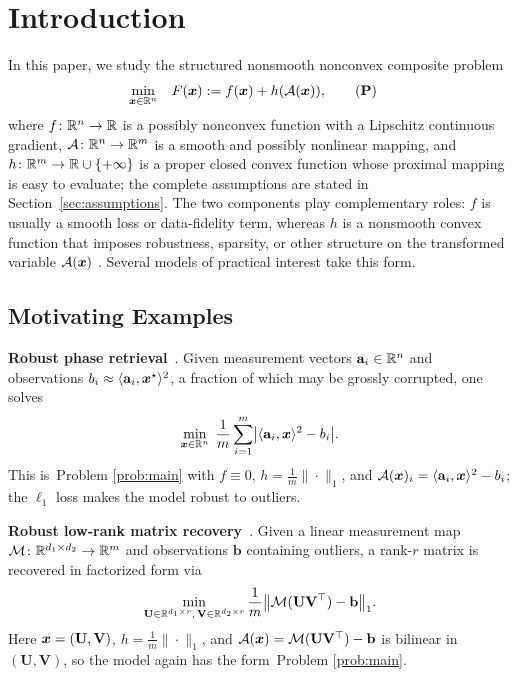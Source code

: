 \section{Introduction}
\label{sec:introduction}
In this paper, we study the structured nonsmooth nonconvex composite problem
\begin{align}
    \min_{\bx\in\RR^n}\quad & F(\bx) := f(\bx) + h(\calA(\bx)),
    \tag{\textbf{P}}
    \label{prob:main}
\end{align}
where $f\colon\mathbb{R}^n\to\mathbb{R}$ is a possibly nonconvex function with a Lipschitz
continuous gradient, $\mathcal{A}\colon\mathbb{R}^n\to\mathbb{R}^m$ is a smooth and possibly nonlinear
mapping, and $h\colon\mathbb{R}^m\to\mathbb{R}\cup\{+\infty\}$ is a proper closed convex function
whose proximal mapping is easy to evaluate; the complete assumptions are stated in
Section~\ref{sec:assumptions}. The two components play complementary roles: $f$ is
usually a smooth loss or data-fidelity term, whereas $h$ is a nonsmooth convex function
that imposes robustness, sparsity, or other structure on the transformed variable
$\mathcal{A}(\bm{x})$
\cite{charisopoulos2021low,markovsky2008structured,parekh2015convex}. Several models
of practical interest take this form. 

\subsection{Motivating Examples}

\textbf{Robust phase retrieval}~\cite{duchi2019solving}.
Given measurement vectors $\mathbf a_i\in\mathbb{R}^n$ and observations
$b_i\approx\langle\mathbf a_i,\bm{x}^\star\rangle^2$, a fraction of which may be grossly
corrupted, one solves
\begin{equation*}
  \min_{\bm{x}\in\mathbb{R}^n}\;\frac1m\sum_{i=1}^m
  \bigl|\langle\mathbf a_i,\bm{x}\rangle^2-b_i\bigr|.
\end{equation*}
This is~Problem \eqref{prob:main} with $f\equiv0$, $h=\frac1m\|\cdot\|_1$, and
$\mathcal{A}(\bm{x})_i=\langle\mathbf a_i,\bm{x}\rangle^2-b_i$; the $\ell_1$ loss makes the
model robust to outliers.

\textbf{Robust low-rank matrix recovery}~\cite{charisopoulos2021low}.
Given a linear measurement map $\mathcal M\colon\mathbb{R}^{d_1\times d_2}\to\mathbb{R}^m$ and
observations $\mathbf b$ containing outliers, a rank-$r$ matrix is recovered in
factorized form via
\begin{equation*}
  \min_{\mathbf U\in\mathbb{R}^{d_1\times r},\,\mathbf V\in\mathbb{R}^{d_2\times r}}
  \frac1m\bigl\|\mathcal M(\mathbf U\mathbf V^\top)-\mathbf b\bigr\|_1.
\end{equation*}
Here $\bm{x}=(\mathbf U,\mathbf V)$, $h=\frac1m\|\cdot\|_1$, and
$\mathcal{A}(\bm{x})=\mathcal M(\mathbf U\mathbf V^\top)-\mathbf b$ is bilinear in
$(\mathbf U,\mathbf V)$, so the model again has the form~Problem \eqref{prob:main}.

